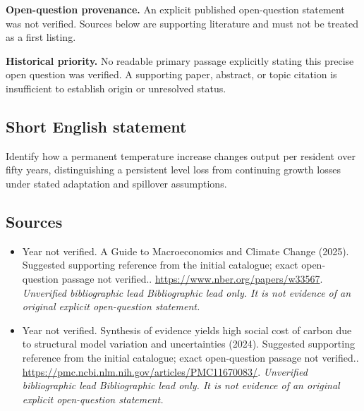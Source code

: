 \documentclass[11pt]{article}
\begin{document}
\par\textbf{Open-question provenance.} An explicit published open-question statement was not verified. Sources below are supporting literature and must not be treated as a first listing.

\par\textbf{Historical priority.} No readable primary passage explicitly stating this precise open question was verified. A supporting paper, abstract, or topic citation is insufficient to establish origin or unresolved status.

\subsection{Short English statement}
Identify how a permanent temperature increase changes output per resident over fifty years, distinguishing a persistent level loss from continuing growth losses under stated adaptation and spillover assumptions.

\subsection{Sources}
\begin{itemize}\raggedright
\item[\textnormal{[S1]}]\hypertarget{source:30007712:1}{} Year not verified. A Guide to Macroeconomics and Climate Change (2025). Suggested supporting reference from the initial catalogue; exact open-question passage not verified..
\url{https://www.nber.org/papers/w33567}.
{\small\textit{Unverified bibliographic lead Bibliographic lead only. It is not evidence of an original explicit open-question statement.}}

\item[\textnormal{[S2]}]\hypertarget{source:30007712:2}{} Year not verified. Synthesis of evidence yields high social cost of carbon due to structural model variation and uncertainties (2024). Suggested supporting reference from the initial catalogue; exact open-question passage not verified..
\url{https://pmc.ncbi.nlm.nih.gov/articles/PMC11670083/}.
{\small\textit{Unverified bibliographic lead Bibliographic lead only. It is not evidence of an original explicit open-question statement.}}
\end{itemize}
\end{document}

